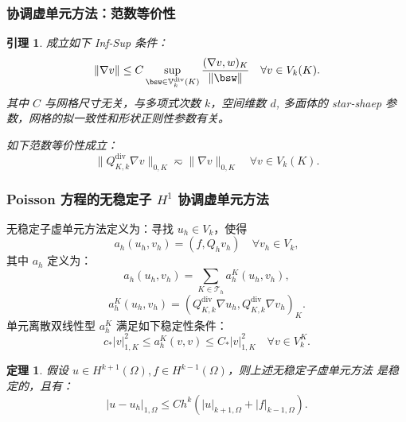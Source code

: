 \documentclass[notheorems,serif]{beamer}
\newcommand{\hei}[1]{{\HEI#1}}
\newtheorem{theorem}{\hei{定理}}
\newtheorem{lemma}{\hei{引理}}
\begin{document}
\begin{frame}
    \frametitle{协调虚单元方法：范数等价性}
    \begin{lemma}
        成立如下 Inf-Sup 条件：
        $$
        \|\nabla v\| \leq C \sup_{\bsw \in
        \mathbb{V}^{\mathrm{div}}_{k}(K)}\frac{(\nabla v,
        w)_K}{\|\bsw\|} \quad \forall v \in V_k(K).
        $$
        其中 $C$ 与网格尺寸无关，与多项式次数 $k$，空间维数 $d$, 多面体的
        star-shaep 参数，网格的拟一致性和形状正则性参数有关。
        
        如下范数等价性成立：
        $$
        \|Q_{K, k}^{\mathrm{div}}\nabla v\|_{0, K} \eqsim \|\nabla v\|_{0, K} 
        \quad \forall v \in V_k(K).
        $$
    \end{lemma}
\end{frame}

\begin{frame}
    \frametitle{Poisson 方程的无稳定子 $H^1$ 协调虚单元方法}
无稳定子虚单元方法定义为：寻找 $u_h \in V_k$，使得
$$
a_h(u_h, v_h) = (f, Q_h v_h) \quad \forall v_h \in V_k,
$$
其中 $a_h$ 定义为：
$$
a_h(u_h, v_h) = \sum_{K \in \mathcal{T}_h} a_h^K(u_h, v_h),
$$
$$
a_h^K(u_h, v_h) = (Q_{K, k}^{\mathrm{div}}\nabla u_h, Q_{K,
k}^{\mathrm{div}}\nabla v_h)_K.
$$
单元离散双线性型 $a_h^K$ 满足如下稳定性条件：
$$
c_* |v|_{1, K}^2 \leq a_h^K(v, v) \leq C_* |v|_{1, K}^2 \quad \forall v \in
V_k^K.
$$
\begin{theorem}
假设 $u \in H^{k+1}(\Omega), f \in H^{k-1}(\Omega)$，则上述无稳定子虚单元方法
是稳定的，且有：
$$
|u - u_h|_{1, \Omega} \leq C h^{k}
(|u|_{k+1, \Omega} + |f|_{k-1, \Omega}).
$$
\end{theorem}
\end{frame}
\end{document}
